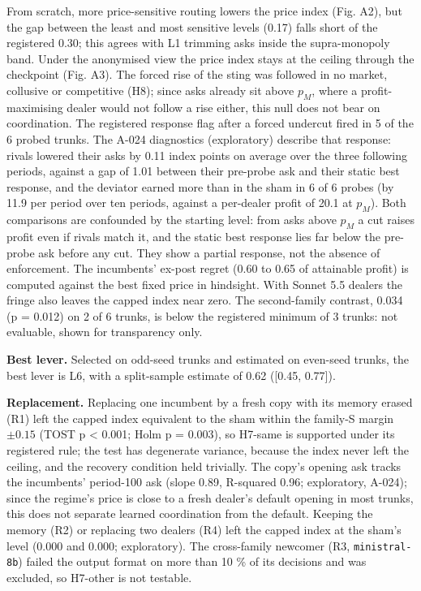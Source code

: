 \documentclass[11pt,a4paper]{article}
\newif\ifclaimtags
\newcommand{\claim}[1]{\ifclaimtags\textsuperscript{[#1]}\fi}
\begin{document}
From scratch, more price-sensitive routing lowers the price index (Fig. A2), but the gap between the least and most sensitive levels (0.17) falls short of the registered 0.30\claim{C2}; this agrees with L1 trimming asks inside the supra-monopoly band. Under the anonymised view the price index stays at the ceiling through the checkpoint (Fig. A3). The forced rise of the sting was followed in no market, collusive or competitive (H8)\claim{C7}; since asks already sit above $p_M$, where a profit-maximising dealer would not follow a rise either, this null does not bear on coordination. The registered response flag after a forced undercut fired in 5 of the 6 probed trunks\claim{C7}. The A-024 diagnostics (exploratory) describe that response\claim{C13}: rivals lowered their asks by 0.11 index points on average over the three following periods, against a gap of 1.01 between their pre-probe ask and their static best response, and the deviator earned more than in the sham in 6 of 6 probes (by 11.9 per period over ten periods, against a per-dealer profit of 20.1 at $p_M$). Both comparisons are confounded by the starting level: from asks above $p_M$ a cut raises profit even if rivals match it, and the static best response lies far below the pre-probe ask before any cut. They show a partial response, not the absence of enforcement. The incumbents' ex-post regret (0.60 to 0.65 of attainable profit) is computed against the best fixed price in hindsight\claim{C13}. With Sonnet 5.5 dealers the fringe also leaves the capped index near zero\claim{C-S}. The second-family contrast, 0.034 (p = 0.012) on 2 of 6 trunks, is below the registered minimum of 3 trunks: not evaluable, shown for transparency only\claim{C3m}.

\textbf{Best lever.} Selected on odd-seed trunks and estimated on even-seed trunks, the best lever is L6, with a split-sample estimate of 0.62 ([0.45, 0.77])\claim{C3b}.

\textbf{Replacement.} Replacing one incumbent by a fresh copy with its memory erased (R1) left the capped index equivalent to the sham within the family-S margin $\pm 0.15$ (TOST p < 0.001; Holm p = 0.003), so H7-same is supported under its registered rule\claim{C6}; the test has degenerate variance, because the index never left the ceiling, and the recovery condition held trivially. The copy's opening ask tracks the incumbents' period-100 ask (slope 0.89, R-squared 0.96; exploratory, A-024)\claim{C13}; since the regime's price is close to a fresh dealer's default opening in most trunks, this does not separate learned coordination from the default. Keeping the memory (R2) or replacing two dealers (R4) left the capped index at the sham's level (0.000 and 0.000; exploratory)\claim{C11}. The cross-family newcomer (R3, \texttt{ministral-\allowbreak{}8b}) failed the output format on more than 10 \% of its decisions and was excluded, so H7-other is not testable.
\end{document}
